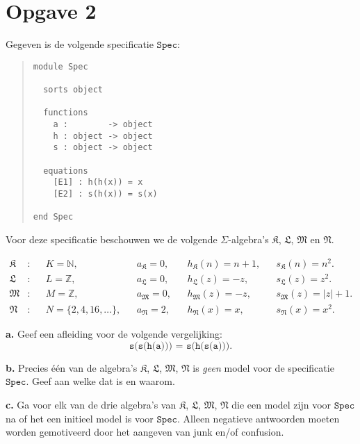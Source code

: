 \documentclass[a4paper,11pt]{article}
\begin{document}
\section*{Opgave 2}

Gegeven is de volgende specificatie $\texttt{Spec}$:

\begin{quote}
\begin{verbatim}
module Spec

  sorts object

  functions
    a :        -> object
    h : object -> object
    s : object -> object

  equations
    [E1] : h(h(x)) = x
    [E2] : s(h(x)) = s(x)

end Spec
\end{verbatim}
\end{quote}

Voor deze specificatie beschouwen we de volgende $\Sigma$-algebra's
$\mathfrak{K}$, $\mathfrak{L}$, $\mathfrak{M}$ en $\mathfrak{N}$.

\begin{align*}
\mathfrak{K} &: & &K = \mathbb{N}, & &a_{\mathfrak{K}} = 0, & &h_{\mathfrak{K}}(n) = n+1, & &s_{\mathfrak{K}}(n) = n^{2}. \\
\mathfrak{L} &: & &L = \mathbb{Z}, & &a_{\mathfrak{L}} = 0, & &h_{\mathfrak{L}}(z) = -z, & &s_{\mathfrak{L}}(z) = z^{2}. \\
\mathfrak{M} &: & &M = \mathbb{Z}, & &a_{\mathfrak{M}} = 0, & &h_{\mathfrak{M}}(z) = -z, & &s_{\mathfrak{M}}(z) = |z|+1. \\
\mathfrak{N} &: & &N = \{2,4,16,\ldots\}, & &a_{\mathfrak{N}} = 2, & &h_{\mathfrak{N}}(x) = x, & &s_{\mathfrak{N}}(x) = x^{2}.
\end{align*}

\begin{description}

\item{\bf a.}
Geef een afleiding voor de volgende vergelijking:
\begin{displaymath}
\texttt{s(s(h(a))) = s(h(s(a)))}.
\end{displaymath}

\item{\bf b.}
Precies \'e\'en van de algebra's $\mathfrak{K}$, $\mathfrak{L}$,
$\mathfrak{M}$, $\mathfrak{N}$ is \emph{geen} model voor de specificatie
$\texttt{Spec}$. Geef aan welke dat is en waarom.

\item{\bf c.}
Ga voor elk van de drie algebra's van $\mathfrak{K}$, $\mathfrak{L}$,
$\mathfrak{M}$, $\mathfrak{N}$ die een model zijn voor $\texttt{Spec}$ na of
het een initieel model is voor $\texttt{Spec}$. Alleen negatieve antwoorden
moeten worden gemotiveerd door het aangeven van junk en/of confusion.

\end{description}
\end{document}
